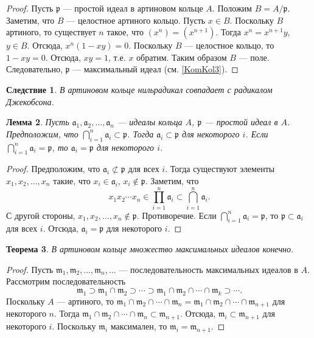 \documentclass[12pt, titlepage, oneside]{amsbook}
\newcommand{\aaa}{\mathfrak{a}}
\newcommand{\ppp}{\mathfrak{p}}
\newcommand{\mmm}{\mathfrak{m}}
\newtheorem{theorem}{Теорема}[chapter]
\newtheorem{lemma}[theorem]{Лемма}
\newtheorem{corollary}[theorem]{Следствие}
\theoremstyle{definition}
\theoremstyle{remark}
\begin{document}
\begin{proof}
	Пусть $\ppp$ --- простой идеал в артиновом кольце $A$. Положим $B=A/\ppp$. Заметим, что $B$ --- целостное артиного кольцо. Пусть $x\in B$. Поскольку $B$ артиного, то существует $n$ такое, что $(x^n)=(x^{n+1})$. Тогда $x^n=x^{n+1}y$, $y\in B$. Отсюда, $x^n(1-xy)=0$. Поскольку $B$ --- целостное кольцо, то $1-xy=0$. Отсюда, $xy=1$, т.е. $x$ обратим. Таким образом $B$ --- поле. Следовательно, $\ppp$ --- максимальный идеал (см. \ref{KomKol3}).
\end{proof}

\begin{corollary}
	\label{Art4}
	В артиновом кольце нильрадикал совпадает с радикалом Джекобсона.
\end{corollary}

\begin{lemma}
	\label{ArtL1}
	Пусть $\aaa_1,\aaa_2,\ldots,\aaa_n$ --- идеалы кольца $A$, $\ppp$ --- простой идеал в $A$. Предположим, что $\bigcap\limits_{i=1}^n\aaa_i\subset\ppp$. Тогда $\aaa_i\subset\ppp$ для некоторого $i$. Если $\bigcap\limits_{i=1}^n\aaa_i=\ppp$, то $\aaa_i=\ppp$ для некоторого $i$.
\end{lemma}

\begin{proof}
	Предположим, что $\aaa_i\not\subset\ppp$ для всех $i$. Тогда существуют элементы $x_1,x_2,\ldots,x_n$ такие, что $x_i\in\aaa_i$, $x_i\not\in\ppp$. Заметим, что $$x_1x_2\cdots x_n\in\prod\limits_{i=1}^n\aaa_i\subset\bigcap\limits_{i=1}^n\aaa_i.$$ С другой стороны, $x_1,x_2,\ldots,x_n\not\in\ppp$. Противоречие. Если $\bigcap\limits_{i=1}^n\aaa_i=\ppp$, то $\ppp\subset\aaa_i$ для всех $i$. Отсюда, $\aaa_i=\ppp$ для некоторого $i$.
\end{proof}


\begin{theorem}
	\label{Art5}
	В артиновом кольце множество максимальных идеалов конечно.
\end{theorem}

\begin{proof}
	Пусть $\mmm_1,\mmm_2,\ldots,\mmm_n,\ldots$ --- последовательность максимальных идеалов в $A$. Рассмотрим последовательность $$\mmm_1\supset\mmm_1\cap\mmm_2\supset\cdots\supset\mmm_1\cap\mmm_2\cap\cdots\cap\mmm_k\supset\cdots.$$ Поскольку $A$ --- артиного, то $\mmm_1\cap\mmm_2\cap\cdots\cap\mmm_n=\mmm_1\cap\mmm_2\cap\cdots\cap\mmm_{n+1}$ для некоторого $n$. Тогда $\mmm_1\cap\mmm_2\cap\cdots\cap\mmm_n\subset\mmm_{n+1}$. Отсюда, $\mmm_i\subset\mmm_{n+1}$ для некоторого $i$. Поскольку $\mmm_i$ максимален, то $\mmm_i=\mmm_{n+1}$.
\end{proof}
\end{document}
